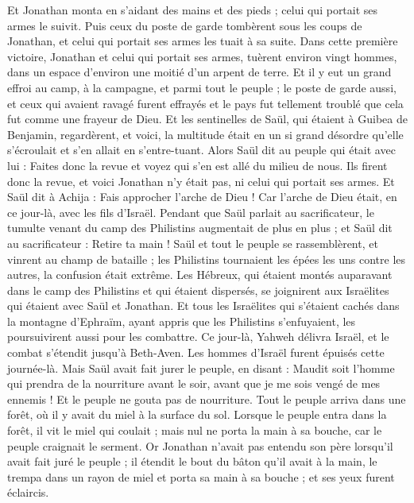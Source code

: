 \begin{multicols}{2}
Et Jonathan monta en s'aidant des mains et des pieds ; celui qui portait ses armes le suivit. Puis ceux du poste de garde tombèrent sous les coups de Jonathan, et celui qui portait ses armes les tuait à sa suite.
Dans cette première victoire, Jonathan et celui qui portait ses armes, tuèrent environ vingt hommes, dans un espace d'environ une moitié d'un arpent de terre.
Et il y eut un grand effroi au camp, à la campagne, et parmi tout le peuple ; le poste de garde aussi, et ceux qui avaient ravagé furent effrayés et le pays fut tellement troublé que cela fut comme une frayeur de Dieu.
Et les sentinelles de Saül, qui étaient à Guibea de Benjamin, regardèrent, et voici, la multitude était en un si grand désordre qu'elle s'écroulait et s'en allait en s'entre-tuant.
Alors Saül dit au peuple qui était avec lui : Faites donc la revue et voyez qui s'en est allé du milieu de nous. Ils firent donc la revue, et voici Jonathan n'y était pas, ni celui qui portait ses armes.
Et Saül dit à Achija : Fais approcher l'arche de Dieu ! Car l'arche de Dieu était, en ce jour-là, avec les fils d'Israël.
Pendant que Saül parlait au sacrificateur, le tumulte venant du camp des Philistins augmentait de plus en plus ; et Saül dit au sacrificateur : Retire ta main !
Saül et tout le peuple se rassemblèrent, et vinrent au champ de bataille ; les Philistins tournaient les épées les uns contre les autres, la confusion était extrême.
Les Hébreux, qui étaient montés auparavant dans le camp des Philistins et qui étaient dispersés, se joignirent aux Israëlites qui étaient avec Saül et Jonathan.
Et tous les Israëlites qui s'étaient cachés dans la montagne d'Ephraïm, ayant appris que les Philistins s'enfuyaient, les poursuivirent aussi pour les combattre.
Ce jour-là, Yahweh délivra Israël, et le combat s'étendit jusqu'à Beth-Aven.
Les hommes d'Israël furent épuisés cette journée-là. Mais Saül avait fait jurer le peuple, en disant : Maudit soit l'homme qui prendra de la nourriture avant le soir, avant que je me sois vengé de mes ennemis ! Et le peuple ne gouta pas de nourriture.
Tout le peuple arriva dans une forêt, où il y avait du miel à la surface du sol.
Lorsque le peuple entra dans la forêt, il vit le miel qui coulait ; mais nul ne porta la main à sa bouche, car le peuple craignait le serment.
Or Jonathan n'avait pas entendu son père lorsqu'il avait fait juré le peuple ; il étendit le bout du bâton qu'il avait à la main, le trempa dans un rayon de miel et porta sa main à sa bouche ; et ses yeux furent éclaircis.

\end{multicols}
